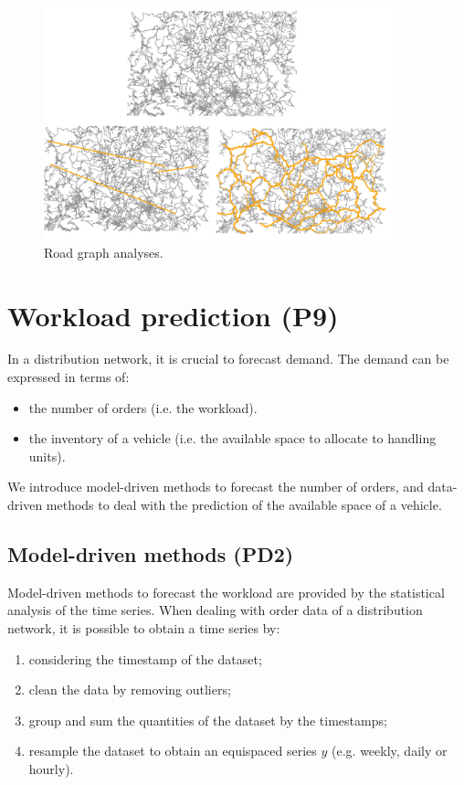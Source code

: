 \begin{figure}[hbt!]
\centering
\includegraphics[width=0.9\textwidth]{SectionDistribution/control_figures/fig_road_graph.png}
\captionsetup{type=figure}
\caption{Road graph analyses.}
\label{fig_road_graph}
\end{figure}





\section{Workload prediction (P9)} \label{secDistWorkloadPrediction}
In a distribution network, it is crucial to forecast demand. The demand can be expressed in terms of:
\begin{itemize}
    \item the number of orders (i.e. the workload).
    \item the inventory of a vehicle (i.e. the available space to allocate to handling units).

\end{itemize}

We introduce model-driven methods to forecast the number of orders, and data-driven methods to deal with the prediction of the available space of a vehicle.

\subsection{Model-driven methods (PD2)}
Model-driven methods to forecast the workload are provided by the statistical analysis of the time series. When dealing with order data of a distribution network, it is possible to obtain a time series by:
\begin{enumerate}
    \item considering the timestamp of the dataset;
	\item clean the data by removing outliers;
	\item group and sum the quantities of the dataset by the timestamps;
	\item resample the dataset to obtain an equispaced series $y$ (e.g. weekly, daily or hourly).

\end{enumerate}

